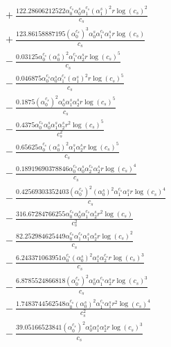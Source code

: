 \documentclass[10pt]{article}
\begin{document}
\begin{align*}
&{}  + \frac{122.28606212522 \alpha_{0}^{c_s} \alpha_{0}^s \alpha_{1}^{c_s} \left(\alpha_{1}^s\right)^{2} r \log{\left(c_{s} \right)}^{2}}{c_{s}} \\
&{}  + \frac{123.86158887195 \left(\alpha_{0}^{c_s}\right)^{3} \alpha_{0}^s \alpha_{1}^{c_s} \alpha_{1}^s r \log{\left(c_{s} \right)}}{c_{s}} \\
&{}  - \frac{0.03125 \alpha_{0}^{c_s} \left(\alpha_{0}^s\right)^{2} \alpha_{1}^{c_s} \alpha_{2}^s r \log{\left(c_{s} \right)}^{5}}{c_{s}} \\
&{}  - \frac{0.046875 \alpha_{0}^{c_s} \alpha_{0}^s \alpha_{1}^{c_s} \left(\alpha_{1}^s\right)^{2} r \log{\left(c_{s} \right)}^{5}}{c_{s}} \\
&{}  - \frac{0.1875 \left(\alpha_{0}^{c_s}\right)^{2} \alpha_{0}^s \alpha_{1}^s \alpha_{2}^s r \log{\left(c_{s} \right)}^{5}}{c_{s}} \\
&{}  - \frac{0.4375 \alpha_{0}^{c_s} \alpha_{0}^s \alpha_{1}^s \alpha_{2}^s r^{2} \log{\left(c_{s} \right)}^{5}}{c_{s}^{2}} \\
&{}  - \frac{0.65625 \alpha_{0}^{c_s} \left(\alpha_{0}^s\right)^{2} \alpha_{1}^s \alpha_{2}^s r \log{\left(c_{s} \right)}^{5}}{c_{s}} \\
&{}  - \frac{0.18919690378846 \alpha_{0}^{c_s} \alpha_{0}^s \alpha_{2}^{c_s} \alpha_{2}^s r \log{\left(c_{s} \right)}^{4}}{c_{s}} \\
&{}  - \frac{0.42569303352403 \left(\alpha_{0}^{c_s}\right)^{2} \left(\alpha_{0}^s\right)^{2} \alpha_{1}^{c_s} \alpha_{1}^s r \log{\left(c_{s} \right)}^{4}}{c_{s}} \\
&{}  - \frac{316.67284766255 \alpha_{0}^{c_s} \alpha_{0}^s \alpha_{1}^{c_s} \alpha_{2}^s r^{2} \log{\left(c_{s} \right)}}{c_{s}^{2}} \\
&{}  - \frac{82.252984625449 \alpha_{0}^{c_s} \alpha_{1}^{c_s} \alpha_{1}^s \alpha_{2}^s r \log{\left(c_{s} \right)}^{2}}{c_{s}} \\
&{}  - \frac{6.243371063951 \alpha_{0}^{c_s} \left(\alpha_{0}^s\right)^{2} \alpha_{1}^s \alpha_{2}^{c_s} r \log{\left(c_{s} \right)}^{3}}{c_{s}} \\
&{}  - \frac{6.8785524866818 \left(\alpha_{0}^{c_s}\right)^{2} \alpha_{0}^s \alpha_{1}^{c_s} \alpha_{2}^s r \log{\left(c_{s} \right)}^{3}}{c_{s}} \\
&{}  - \frac{1.7483744562548 \alpha_{0}^{c_s} \left(\alpha_{0}^s\right)^{2} \alpha_{1}^{c_s} \alpha_{1}^s r^{2} \log{\left(c_{s} \right)}^{4}}{c_{s}^{2}} \\
&{}  - \frac{39.05166523841 \left(\alpha_{0}^{c_s}\right)^{2} \alpha_{0}^s \alpha_{1}^s \alpha_{2}^s r \log{\left(c_{s} \right)}^{3}}{c_{s}} \\

\end{align*}
\end{document}
